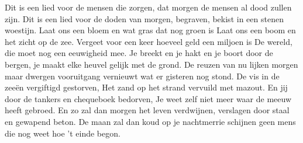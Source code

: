 \beginverse
Dit is een lied voor de mensen die zorgen,
dat morgen de mensen al dood zullen zijn.
Dit is een lied voor de doden van morgen,
begraven, bekist in een stenen woestijn. 
\endverse
\beginchorus
Laat ons een bloem en wat gras dat nog groen is
Laat ons een boom en het zicht op de zee.
Vergeet voor een keer hoeveel geld een miljoen is
De wereld, die moet nog een eeuwigheid mee. 
\endchorus
\beginverse
Je breekt en je hakt en je boort door de bergen,
je maakt elke heuvel gelijk met de grond.
De reuzen van nu lijken morgen maar dwergen
vooruitgang vernieuwt wat er gisteren nog stond. 
\endverse
\beginverse
De vis in de zeeën vergiftigd gestorven,
Het zand op het strand vervuild met mazout. 
En jij door de tankers en chequeboek bedorven,
Je weet zelf niet meer waar de meeuw heeft gebroed. 
\endverse
\beginverse
En zo zal dan morgen het leven verdwijnen,
verslagen door staal en gewapend beton.
De maan zal dan koud op je nachtmerrie schijnen
geen mens die nog weet hoe 't einde begon. 
\endverse
\endsong